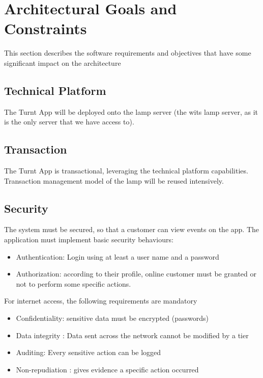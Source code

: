 \documentclass[10pt,a4paper]{article}
\begin{document}
\section{Architectural Goals and Constraints} 

This section describes the software requirements and objectives that have some significant impact on the architecture

\subsection{Technical Platform}

The Turnt App will be deployed onto the lamp server (the wits lamp server, as it is the only server that we have access to). 

\subsection{ Transaction}

The Turnt App is transactional, leveraging the technical platform capabilities. Transaction management model of the lamp will be reused intensively.

\subsection{ Security}

The system must be secured, so that a customer can view events on the app.
The application must implement basic security behaviours:
\begin{itemize}
\item Authentication: Login using at least a user name and a password
\item Authorization: according to their profile, online customer must be granted or not to perform some specific actions.
\end{itemize}	
For internet access, the following requirements are mandatory

\begin{itemize}
\item Confidentiality: sensitive data must be encrypted (passwords)
\item Data integrity : Data sent across the network cannot be modified by a tier
\item Auditing: Every sensitive action can be logged
\item Non-repudiation : gives evidence a specific action occurred
\end{itemize}
\end{document}
